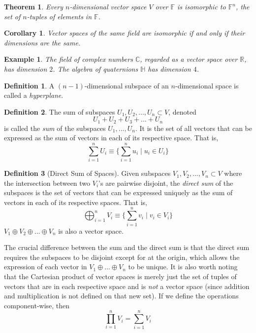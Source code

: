 \documentclass{article}
\newtheorem{theorem}{Theorem}[section]
\newtheorem{example}{Example}[section]
\newtheorem{corollary}{Corollary}[theorem]
\theoremstyle{remark}
\theoremstyle{definition}
\newtheorem{definition}{Definition}[section]
\begin{document}
\begin{theorem}
Every $n$-dimensional vector space $V$ over $\mathbb{F}$ is isomorphic to $\mathbb{F}^n$, the set of $n$-tuples of elements in $\mathbb{F}$. 
\end{theorem}

\begin{corollary}
Vector spaces of the same field are isomorphic if and only if their dimensions are the same. 
\end{corollary}

\begin{example}
The field of complex numbers $\mathbb{C}$, regarded as a vector space over $\mathbb{R}$, has dimension $2$. The algebra of quaternions $\mathbb{H}$ has dimension $4$. 
\end{example}

\begin{definition}
A $(n - 1)$-dimensional subspace of an $n$-dimensional space is called a \textit{hyperplane}. 
\end{definition}

\begin{definition}
The sum of subspaces $U_1, U_2, ..., U_n \subset V$, denoted
\[U_1 + U_2 + U_3 + ... + U_n\]
is called the \textit{sum} of the subspaces $U_1, ..., U_n$. It is the set of all vectors that can be expressed as the sum of vectors in each of its respective space. That is, 
\[ \sum_{i=1}^n U_i \equiv \Big\{ \sum_{i = 1}^n u_i \;|\; u_i \in U_i\Big\}\]

\end{definition}

\begin{definition}[Direct Sum of Spaces]
Given subspaces $V_1, V_2, ..., V_n \subset V$ where the intersection between two $V_i$'s are pairwise disjoint, the \textit{direct sum} of the subspaces is the set of vectors that can be expressed uniquely as the sum of vectors in each of its respective spaces. That is, 
\[\bigoplus_{i=1}^n V_i \equiv \Big\{ \sum_{i=1}^n v_i \; | \; v_i \in V_i\Big\}\]
$V_1 \oplus V_2 \oplus ... \oplus V_n$ is also a vector space. 
\end{definition}

The crucial difference between the sum and the direct sum is that the direct sum requires the subspaces to be disjoint except for at the origin, which allows the expression of each vector in $V_1 \oplus ... \oplus V_n$ to be unique. It is also worth noting that the Cartesian product of vector spaces is merely just the set of tuples of vectors that are in each respective space and is \textit{not} a vector space (since addition and multiplication is not defined on that new set). If we define the operations component-wise, then 
\[ \prod_{i=1}^n V_i = \sum_{i=1}^n V_i\]
\end{document}
